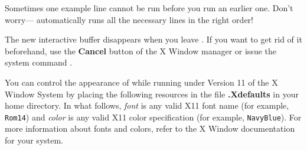 Sometimes one example line cannot be run before you run an earlier one.
Don't worry---\HyperName{} automatically runs all the necessary
lines in the right order!

The new interactive \Language{} buffer disappears when you leave
\HyperName{}.
If you want to get rid of it beforehand,
use the {\bf Cancel} button of the X Window manager
or issue the \Language{} system command .

%
You can control the appearance of \HyperName{} while running under Version 11
of the X Window System by placing the following resources
in the file {\bf .Xdefaults} in your home directory.
In what follows, {\it font} is any valid X11 font name
(for example, {\tt Rom14}) and {\it color} is any valid X11 color
specification (for example, {\tt NavyBlue}).
For more information about fonts and colors, refer to the
X Window documentation for your system.
